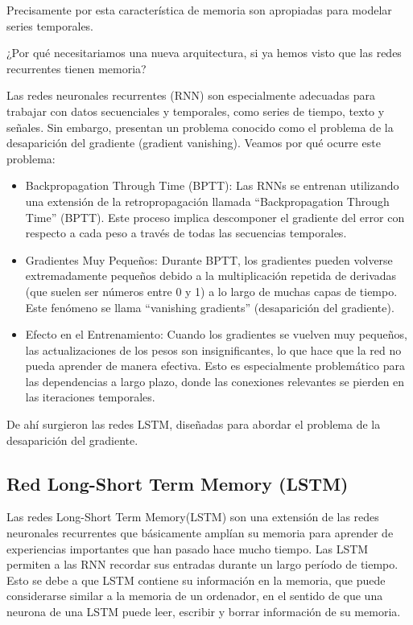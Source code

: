 \documentclass[
  a4paper,
  DIV=11,
  numbers=noendperiod]{scrreprt}
\begin{document}
Precisamente por esta característica de memoria son apropiadas para
modelar series temporales.

¿Por qué necesitariamos una nueva arquitectura, si ya hemos visto que
las redes recurrentes tienen memoria?

Las redes neuronales recurrentes (RNN) son especialmente adecuadas para
trabajar con datos secuenciales y temporales, como series de tiempo,
texto y señales. Sin embargo, presentan un problema conocido como el
problema de la desaparición del gradiente (gradient vanishing). Veamos
por qué ocurre este problema:

\begin{itemize}
\item
  Backpropagation Through Time (BPTT): Las RNNs se entrenan utilizando
  una extensión de la retropropagación llamada ``Backpropagation Through
  Time'' (BPTT). Este proceso implica descomponer el gradiente del error
  con respecto a cada peso a través de todas las secuencias temporales.
\item
  Gradientes Muy Pequeños: Durante BPTT, los gradientes pueden volverse
  extremadamente pequeños debido a la multiplicación repetida de
  derivadas (que suelen ser números entre 0 y 1) a lo largo de muchas
  capas de tiempo. Este fenómeno se llama ``vanishing gradients''
  (desaparición del gradiente).
\item
  Efecto en el Entrenamiento: Cuando los gradientes se vuelven muy
  pequeños, las actualizaciones de los pesos son insignificantes, lo que
  hace que la red no pueda aprender de manera efectiva. Esto es
  especialmente problemático para las dependencias a largo plazo, donde
  las conexiones relevantes se pierden en las iteraciones temporales.
\end{itemize}

De ahí surgieron las redes LSTM, diseñadas para abordar el problema de
la desaparición del gradiente.

\subsection{Red Long-Short Term Memory
(LSTM)}\label{red-long-short-term-memory-lstm}

Las redes Long-Short Term Memory(LSTM) son una extensión de las redes
neuronales recurrentes que básicamente amplían su memoria para aprender
de experiencias importantes que han pasado hace mucho tiempo. Las LSTM
permiten a las RNN recordar sus entradas durante un largo período de
tiempo. Esto se debe a que LSTM contiene su información en la memoria,
que puede considerarse similar a la memoria de un ordenador, en el
sentido de que una neurona de una LSTM puede leer, escribir y borrar
información de su memoria.
\end{document}
